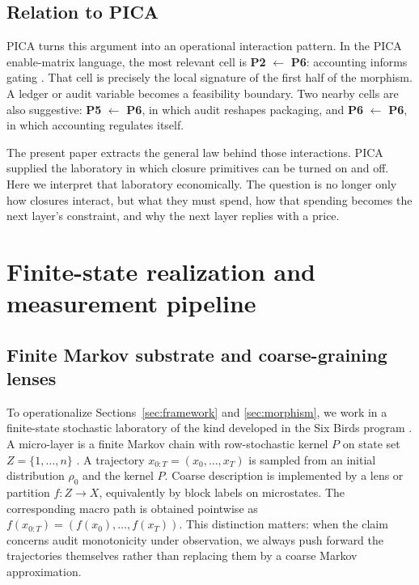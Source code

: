 \documentclass[11pt,a4paper]{article}
\begin{document}
\subsection{Relation to PICA}

PICA turns this argument into an operational interaction pattern. In the PICA enable-matrix language, the most relevant cell is \textbf{P2} $\leftarrow$ \textbf{P6}: accounting informs gating \cite{tsiokos2026create}. That cell is precisely the local signature of the first half of the morphism. A ledger or audit variable becomes a feasibility boundary. Two nearby cells are also suggestive: \textbf{P5} $\leftarrow$ \textbf{P6}, in which audit reshapes packaging, and \textbf{P6} $\leftarrow$ \textbf{P6}, in which accounting regulates itself.

The present paper extracts the general law behind those interactions. PICA supplied the laboratory in which closure primitives can be turned on and off. Here we interpret that laboratory economically. The question is no longer only how closures interact, but what they must spend, how that spending becomes the next layer's constraint, and why the next layer replies with a price.
 \section{Finite-state realization and measurement pipeline}\label{sec:methods}

\subsection{Finite Markov substrate and coarse-graining lenses}

To operationalize Sections~\ref{sec:framework} and \ref{sec:morphism}, we work in a finite-state stochastic laboratory of the kind developed in the Six Birds program \cite{tsiokos2026sixbirds,tsiokos2026create}. A micro-layer is a finite Markov chain with row-stochastic kernel \(P\) on state set \(Z=\{1,\dots,n\}\) \cite{kemeny1960finite}. A trajectory \(x_{0:T}=(x_0,\dots,x_T)\) is sampled from an initial distribution \(\rho_0\) and the kernel \(P\). Coarse description is implemented by a lens or partition \(f:Z\to X\), equivalently by block labels on microstates. The corresponding macro path is obtained pointwise as \(f(x_{0:T})=(f(x_0),\dots,f(x_T))\). This distinction matters: when the claim concerns audit monotonicity under observation, we always push forward the trajectories themselves rather than replacing them by a coarse Markov approximation.
\end{document}
